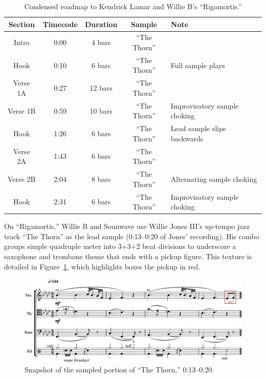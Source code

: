     \begin{table}[ht]
        \centering
            \begin{tabular}{|c|c|c|c|l|}
                \hline
                Section  & Timecode & Duration & Sample        & Note \\ \hline
                Intro    & 0:00     & 4 bars   & ``The Thorn'' & \\ \hline
                Hook     & 0:10     & 6 bars   & ``The Thorn'' & Full sample plays \\ \hline
                Verse 1A & 0:27     & 12 bars  & ``The Thorn'' & \\ \hline
                Verse 1B & 0:59     & 10 bars  & ``The Thorn'' & Improvisatory sample choking \\ \hline
                Hook     & 1:26     & 6 bars   & ``The Thorn'' & Lead sample slips backwards \\ \hline
                Verse 2A & 1:43     & 6 bars   & ``The Thorn'' & \\ \hline
                Verse 2B & 2:04     & 8 bars   & ``The Thorn'' & Alternating sample choking \\ \hline
                Hook     & 2:31     & 6 bars   & ``The Thorn'' & Improvisatory sample choking\\ \hline
            \end{tabular}
        \caption{Condensed roadmap to Kendrick Lamar and Willie B's ``Rigamortis.''}
        \label{tab:rigamortis}
    \end{table}

On ``Rigamortis,'' Willie B and Sounwave use Willie Jones  III's up-tempo jazz track ``The Thorn''
as the lead sample (0:13--0:20 of Jones' recording). His combo groups simple quadruple meter 
into 3+3+2 beat divisions to underscore a saxophone and trombone theme that ends with a pickup
figure. This texture is detailed in Figure~\ref{fig:thethornfull}, which highlights boxes the
pickup in red.

    \begin{figure}[ht]
        \centering
        \includegraphics[width=\textwidth]{images/figures/chp 02/013020thethornfull.pdf}
        \caption{Snapshot of the sampled portion of ``The Thorn,'' 0:13--0:20.}
        \label{fig:thethornfull}
    \end{figure}

